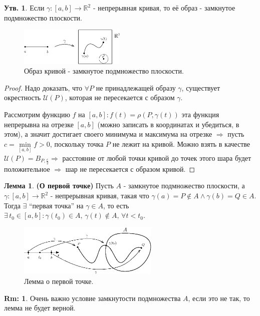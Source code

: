 \documentclass[12pt]{article}
\newcommand{\MR}{\mathbb{R}}
\newcommand{\MU}{\mathcal{U}}
\theoremstyle{definition}
\newtheorem{rem}{Rm:}
\newtheorem{prop}{Утв.}
\newtheorem{lemma}{Лемма}
\begin{document}
\begin{prop}
	Если $\gamma \colon [a,b] \to \MR^2$ - непрерывная кривая, то её образ - замкнутое подмножество плоскости.
\end{prop}
\begin{figure}[H]
	\centering
	\includegraphics[width=0.45\textwidth]{1_14.eps}
	\caption{Образ кривой - замкнутое подмножество плоскости.}
	\label{1_14}
\end{figure}
\begin{proof}
	Надо доказать, что $\forall P$ не принадлежащей образу $\gamma$, существует окрестность $\MU(P)$, которая не пересекается с образом $\gamma$.
	
	Рассмотрим функцию $f$ на $[a,b] \colon f(t) = \rho(P,\gamma(t))$ эта функция непрерывна на отрезке $[a,b]$ (можно записать в координатах и убедиться, в этом), а значит достигает своего минимума и максимума на отрезке $\Rightarrow$ пусть $c = \min\limits_{[a,b]}{f} >0$, поскольку точка $P$ не лежит на кривой. Можно взять в качестве $\MU(P) = B_{P,\frac{c}{2}} \Rightarrow$ расстояние от любой точки кривой до точек этого шара будет положительное $\Rightarrow$ шар не пересекается с образом кривой.
\end{proof}
\begin{lemma}\textbf{(О первой точке)}
	Пусть $A$ - замкнутое подмножество плоскости, а $\gamma \colon [a,b] \to \MR^2$ - непрерывная кривая, такая что $\gamma(a) = P \notin A \wedge \gamma(b) = Q \in A$. Тогда $\exists$ ``первая точка'' на $\gamma \in A$, то есть $\exists \, t_0 \in [a,b] \colon \gamma(t_0) \in A, \, \gamma(t) \notin A, \, \forall t < t_0$. 
\end{lemma}
\begin{figure}[H]
	\centering
	\includegraphics[width=0.6\textwidth]{1_15.eps}
	\caption{Лемма о первой точке.}
	\label{1_15}
\end{figure}
\begin{rem}
	Очень важно условие замкнутости подмножества $A$, если это не так, то лемма не будет верной.
\end{rem}
\end{document}
